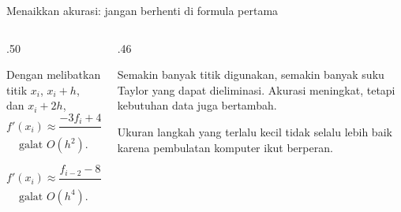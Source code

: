 \documentclass[aspectratio=169,10pt]{beamer}
\begin{document}
\begin{frame}{Menaikkan akurasi: jangan berhenti di formula pertama}
\scriptsize
\begin{columns}[T,totalwidth=\textwidth]
\begin{column}{.50\textwidth}
\begin{bluebox}
Dengan melibatkan titik $x_i$, $x_i+h$, dan $x_i+2h$,
\[
f'(x_i)\approx\frac{-3f_i+4f_{i+1}-f_{i+2}}{2h},
\]
\[
\text{galat }O(h^2).
\]
\end{bluebox}
\begin{orangebox}
\[
f'(x_i)\approx\frac{f_{i-2}-8f_{i-1}+8f_{i+1}-f_{i+2}}{12h},
\]
\[
\text{galat }O(h^4).
\]
\end{orangebox}
\end{column}
\begin{column}{.46\textwidth}
\begin{greenbox}[Intuisi]
Semakin banyak titik digunakan, semakin banyak suku Taylor yang dapat dieliminasi. Akurasi meningkat, tetapi kebutuhan data juga bertambah.
\end{greenbox}
\begin{goldbox}
Ukuran langkah yang terlalu kecil tidak selalu lebih baik karena pembulatan komputer ikut berperan.
\end{goldbox}
\end{column}
\end{columns}
\end{frame}
\end{document}
